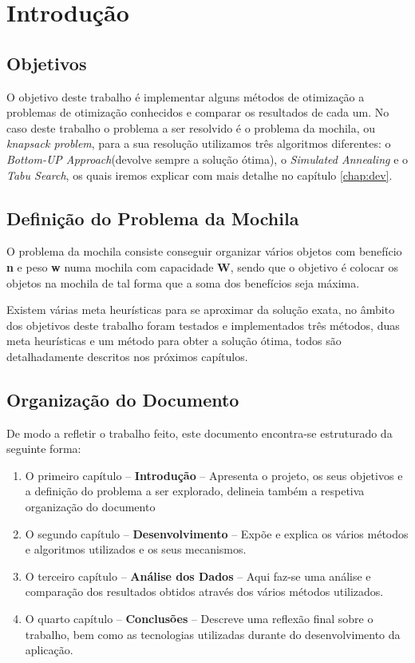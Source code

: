\chapter{Introdução}
\label{chap:intro}

\section{Objetivos}
\label{sec:obj}
O objetivo deste trabalho é implementar alguns métodos de otimização a problemas de otimização conhecidos e comparar os resultados de cada um. No caso deste trabalho o problema a ser resolvido é o problema da mochila, ou \textit{knapsack problem}, para a sua resolução utilizamos três algoritmos diferentes: o \textit{Bottom-UP Approach}(devolve sempre a solução ótima), o \textit{Simulated Annealing} e o \textit{Tabu Search}, os quais iremos explicar com mais detalhe no capítulo \ref{chap:dev}.

\section{Definição do Problema da Mochila}
O problema da mochila consiste conseguir organizar vários objetos com benefício \textbf{n} e peso \textbf{w} numa mochila com capacidade \textbf{W}, sendo que o objetivo é colocar os objetos na mochila de tal forma que a soma dos benefícios seja máxima.

Existem várias meta heurísticas para se aproximar da solução exata, no âmbito dos objetivos deste trabalho foram testados e implementados três métodos, duas meta heurísticas e um método para obter a solução ótima, todos são detalhadamente descritos nos próximos capítulos.


\section{Organização do Documento}
\label{sec:organ}
De modo a refletir o trabalho feito, este documento encontra-se estruturado da seguinte forma:
\begin{enumerate}
    \item O primeiro capítulo -- \textbf{Introdução} -- Apresenta o projeto, os seus objetivos e a definição do problema a ser explorado, delineia também a respetiva organização do documento
    \item O segundo capítulo -- \textbf{Desenvolvimento} -- Expõe e explica os vários métodos e algoritmos utilizados e os seus mecanismos.
    \item O terceiro capítulo -- \textbf{Análise dos Dados} -- Aqui faz-se uma análise e comparação dos resultados obtidos através dos vários métodos utilizados.
    \item O quarto capítulo -- \textbf{Conclusões} -- Descreve uma reflexão final sobre o trabalho, bem como as tecnologias utilizadas durante do desenvolvimento da aplicação.
\end{enumerate}

